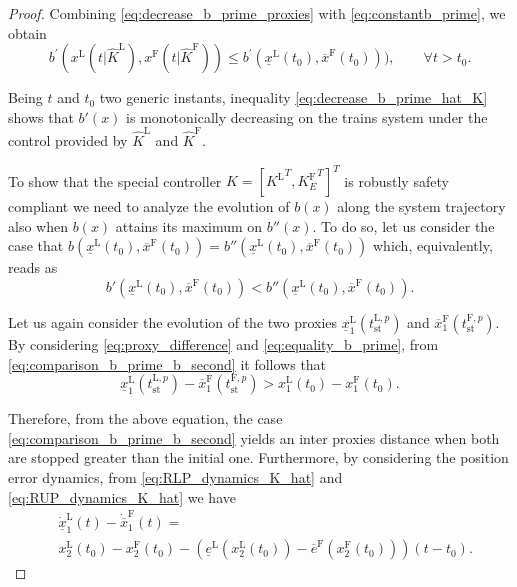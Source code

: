 \begin{theorem}
\begin{proof}
		
		Combining \eqref{eq:decrease_b_prime_proxies}  with \eqref{eq:constantb_prime}, we obtain 
		\begin{equation}\label{eq:decrease_b_prime_hat_K}
			b^\prime(x^\mathrm{L}(t | \hat{K}^\mathrm{L}),x^\mathrm{F}(t | \hat{K}^\mathrm{F}))\leq b^\prime(\underline{x}^\mathrm{L}(t_0),\overline{x}^\mathrm{F}(t_0))), \qquad \forall t>t_0. 
		\end{equation}
		
		Being $t$ and $t_0$ two generic instants, inequality \eqref{eq:decrease_b_prime_hat_K} shows that $b'(x)$ is monotonically decreasing on the trains system under the control provided by $\hat{K}^\mathrm{L}$ and  $\hat{K}^\mathrm{F}$.
		
		To show that the special controller $K=[{K^\mathrm{L}}^T, {K^\mathrm{F}_E}^T]^T$ is robustly safety compliant
		we need to analyze the evolution of $b(x)$ along the system trajectory also when $b(x)$ attains its maximum on $b''(x)$. 
		To do so, let us consider the case that $b(\underline{x}^\mathrm{L}(t_0),\overline{x}^\mathrm{F}(t_0))=b''(\underline{x}^\mathrm{L}(t_0),\overline{x}^\mathrm{F}(t_0))$ which, equivalently, reads as
		\begin{equation}\label{eq:comparison_b_prime_b_second}
			b'(\underline{x}^\mathrm{L}(t_0),\overline{x}^\mathrm{F}(t_0)) <b''(\underline{x}^\mathrm{L}(t_0),\overline{x}^\mathrm{F}(t_0)).
		\end{equation} 
		
		Let us again consider the evolution of the two proxies $\underline{x}_1^\mathrm{L}(t_{\mathrm{st}}^{\mathrm{L},p} )$ and $\overline{x}_1^\mathrm{F}(t_{\mathrm{st}}^{\mathrm{F},p} )$. 
		By considering \eqref{eq:proxy_difference} and \eqref{eq:equality_b_prime}, from \eqref{eq:comparison_b_prime_b_second} it follows that  
		\begin{equation}\label{eq:position_comparison}
			\underline{x}_1^\mathrm{L}(t_{\mathrm{st}}^{\mathrm{L},p} ) -\overline{x}_1^\mathrm{F}(t_{\mathrm{st}}^{\mathrm{F},p}  )>
			x_1^\mathrm{L}(t_0)-x_1^\mathrm{F}(t_0).
		\end{equation}
		
		Therefore, from the above equation, the case \eqref{eq:comparison_b_prime_b_second} yields an inter proxies distance when both are stopped greater than the initial one.  
		Furthermore, by considering the position error dynamics, from \eqref{eq:RLP_dynamics_K_hat} and \eqref{eq:RUP_dynamics_K_hat} we have 
		\begin{align}\label{eq:position_error_derivative}
			&\dot{\underline{x}}_1^\mathrm{L}(t)-\dot{\overline{x}}_1^\mathrm{F}(t)= \nonumber \\
			& x_2^\mathrm{L}(t_0)-x_2^\mathrm{F}(t_0)-
			\left(
			\underline{e}^\mathrm{L}\left(x_2^\mathrm{L}(t_0)\right)-
			\overline{e}^\mathrm{F}\left(x_2^\mathrm{F}(t_0)\right)
			\right)(t-t_0).
		\end{align}
		

\end{proof}
\end{theorem}
